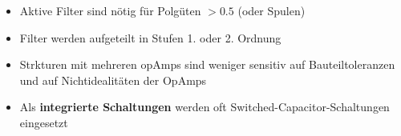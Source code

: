 \begin{itemize}
    \item Aktive Filter sind nötig für Polgüten $> 0.5$ (oder Spulen)
    \item Filter werden aufgeteilt in Stufen 1. oder 2. Ordnung
    \item Strkturen mit mehreren opAmps sind weniger sensitiv auf Bauteiltoleranzen und auf Nichtidealitäten der OpAmps
    \item Als \textbf{integrierte Schaltungen} werden oft Switched-Capacitor-Schaltungen eingesetzt
\end{itemize}